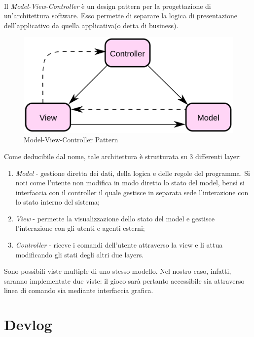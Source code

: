 \documentclass[a4paper, 12pt]{article}
\begin{document}
	\paragraph{}
	Il \emph{Model-View-Controller} è un design pattern per la progettazione di un'architettura software. Esso permette di separare la logica di presentazione dell'applicativo da quella applicativa(o detta di business).\\
	\begin{figure}[h!]
		\centering
		\includegraphics[scale=0.35]{mvc.png}
		\caption{Model-View-Controller Pattern}
	\end{figure}
	
	Come deducibile dal nome, tale architettura è strutturata su 3 differenti layer:\\
	\begin{enumerate}
		\item \emph{Model} - gestione diretta dei dati, della logica e delle regole del programma. Si noti come l'utente non modifica in modo diretto lo stato del model, bensì si interfaccia con il controller il quale gestisce in separata sede l'interazione con lo stato interno del sistema;
		\item \emph{View} - permette la visualizzazione dello stato del model e gestisce l'interazione con gli utenti e agenti esterni; 
		\item \emph{Controller} - riceve i comandi dell'utente attraverso la view e li attua modificando gli stati degli altri due layers.
	\end{enumerate}
	Sono possibili viste multiple di uno stesso modello. Nel nostro caso, infatti, saranno implementate due viste: il gioco sarà pertanto accessibile sia attraverso linea di comando sia mediante interfaccia grafica.

	\newpage
	\section{Devlog}
\end{document}
